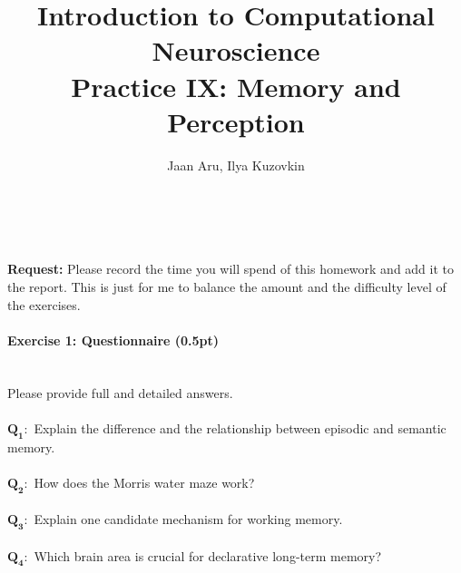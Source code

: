 \documentclass[a4paper,11pt]{article}
\author{\large{Jaan Aru, Ilya Kuzovkin}}
\title{\huge{Introduction to Computational Neuroscience}\\\LARGE{Practice IX: Memory and Perception}}
\newenvironment{exercise}[3]{\paragraph{Exercise #1: #2 (#3pt)}\ \\}{
\medskip}
\newcommand{\question}[2]{\setlength\parindent{0mm}\ \\$\mathbf{Q_{#1}:}$ #2\ \\}
\begin{document}
\maketitle


%
%
\ \\

\ \\
\textbf{Request:} Please record the time you will spend of this homework and add it to the report. This is just for me to balance the amount and the difficulty level of the exercises.

%
%
\begin{exercise}{1}{Questionnaire}{0.5}
Please provide full and detailed answers.\\
\question{1}{Explain the difference and the relationship between episodic and semantic memory.}
\question{2}{How does the Morris water maze work?}
\question{3}{Explain one candidate mechanism for working memory.}
\question{4}{Which brain area is crucial for declarative long-term memory?}
\end{exercise}
\end{document}

